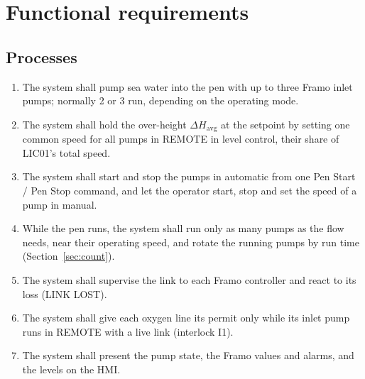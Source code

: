 \documentclass[11pt,a4paper]{article}
\begin{document}
\section{Functional requirements}
\label{sec:freq}

\subsection{Processes}
\begin{enumerate}[label=P\arabic*, leftmargin=10mm]
  \item The system shall pump sea water into the pen with up to three Framo inlet pumps; normally 2 or
        3 run, depending on the operating mode.
  \item The system shall hold the over-height $\Delta H_\text{avg}$ at the setpoint by setting one common
        speed for all pumps in REMOTE in level control, their share of LIC01's total speed.
  \item The system shall start and stop the pumps in automatic from one Pen Start / Pen Stop command,
        and let the operator start, stop and set the speed of a pump in manual.
  \item While the pen runs, the system shall run only as many pumps as the flow needs, near their
        operating speed, and rotate the running pumps by run time (Section~\ref{sec:count}).
  \item The system shall supervise the link to each Framo controller and react to its loss (LINK LOST).
  \item The system shall give each oxygen line its permit only while its inlet pump runs in REMOTE
        with a live link (interlock I1).
  \item The system shall present the pump state, the Framo values and alarms, and the levels on the HMI.
\end{enumerate}
\end{document}
